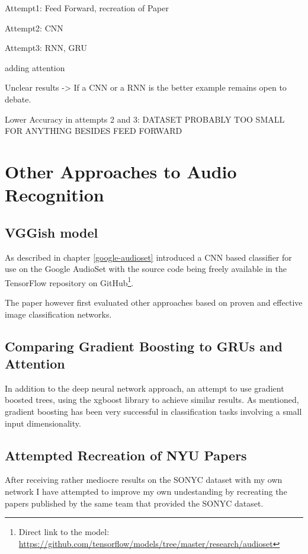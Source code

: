 Attempt1: Feed Forward, recreation of Paper

Attempt2: CNN

Attempt3: RNN, GRU

adding attention


Unclear results -> If a CNN or a RNN is the better example remains open to debate.

Lower Accuracy in attempts 2 and 3: DATASET PROBABLY TOO SMALL FOR ANYTHING BESIDES FEED FORWARD




\chapter{Other Approaches to Audio Recognition}

\section{VGGish model}
\label{vggish}


As described in chapter \ref{google-audioset} \cite{45611} introduced a CNN based classifier for use on the Google AudioSet with the source code being freely available in the TensorFlow repository on GitHub\footnote{Direct link to the model: \url{https://github.com/tensorflow/models/tree/master/research/audioset}}.

The paper however first evaluated other approaches based on proven and effective image classification networks.



\section{Comparing Gradient Boosting to GRUs and Attention}

In addition to the deep neural network approach, an attempt to use gradient boosted trees, using the xgboost library \cite{DBLP:journals/corr/ChenG16} to achieve similar results.  As mentioned, gradient boosting has been very successful in classification tasks involving a small input dimensionality.

\newpage



\section{Attempted Recreation of NYU Papers}

After receiving rather mediocre results on the SONYC dataset with my own network I have attempted to improve my own undestanding by recreating the papers published by the same team that provided the SONYC dataset.


